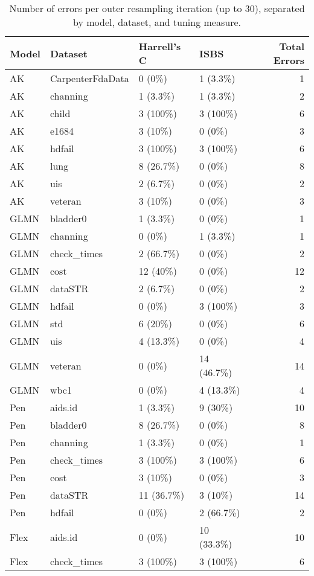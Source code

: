 
\begin{longtable}[t]{llllr}
\caption{Number of errors per outer resampling iteration (up to 30), separated by model, dataset, and tuning measure.\label{tab:errors}}\\
\toprule
Model & Dataset & Harrell's C & ISBS & Total Errors\\
\midrule
AK & CarpenterFdaData & 0 (0\%) & 1 (3.3\%) & 1\\
AK & channing & 1 (3.3\%) & 1 (3.3\%) & 2\\
AK & child & 3 (100\%) & 3 (100\%) & 6\\
AK & e1684 & 3 (10\%) & 0 (0\%) & 3\\
AK & hdfail & 3 (100\%) & 3 (100\%) & 6\\
AK & lung & 8 (26.7\%) & 0 (0\%) & 8\\
AK & uis & 2 (6.7\%) & 0 (0\%) & 2\\
AK & veteran & 3 (10\%) & 0 (0\%) & 3\\
GLMN & bladder0 & 1 (3.3\%) & 0 (0\%) & 1\\
GLMN & channing & 0 (0\%) & 1 (3.3\%) & 1\\
GLMN & check\_times & 2 (66.7\%) & 0 (0\%) & 2\\
GLMN & cost & 12 (40\%) & 0 (0\%) & 12\\
GLMN & dataSTR & 2 (6.7\%) & 0 (0\%) & 2\\
GLMN & hdfail & 0 (0\%) & 3 (100\%) & 3\\
GLMN & std & 6 (20\%) & 0 (0\%) & 6\\
GLMN & uis & 4 (13.3\%) & 0 (0\%) & 4\\
GLMN & veteran & 0 (0\%) & 14 (46.7\%) & 14\\
GLMN & wbc1 & 0 (0\%) & 4 (13.3\%) & 4\\
Pen & aids.id & 1 (3.3\%) & 9 (30\%) & 10\\
Pen & bladder0 & 8 (26.7\%) & 0 (0\%) & 8\\
Pen & channing & 1 (3.3\%) & 0 (0\%) & 1\\
Pen & check\_times & 3 (100\%) & 3 (100\%) & 6\\
Pen & cost & 3 (10\%) & 0 (0\%) & 3\\
Pen & dataSTR & 11 (36.7\%) & 3 (10\%) & 14\\
Pen & hdfail & 0 (0\%) & 2 (66.7\%) & 2\\
Flex & aids.id & 0 (0\%) & 10 (33.3\%) & 10\\
Flex & check\_times & 3 (100\%) & 3 (100\%) & 6\\

\end{longtable}
